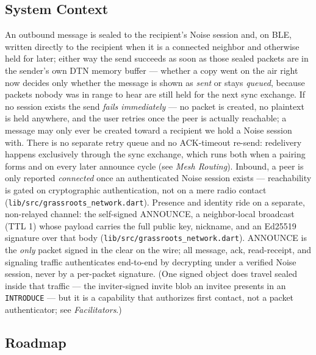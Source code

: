 \documentclass[11pt]{report}
\newcommand{\code}[1]{\texttt{\small #1}}
\begin{document}
\subsection{System Context}

An outbound message is sealed to the recipient's Noise session and, on BLE, written directly to the recipient when it is a connected neighbor and otherwise held for later; either way the send succeeds as soon as those sealed packets are in the sender's own DTN memory buffer — whether a copy went on the air right now decides only whether the message is shown as \emph{sent} or stays \emph{queued}, because packets nobody was in range to hear are still held for the next sync exchange. If no session exists the send \emph{fails immediately} --- no packet is created, no plaintext is held anywhere, and the user retries once the peer is actually reachable; a message may only ever be created toward a recipient we hold a Noise session with. There is no separate retry queue and no ACK-timeout re-send: redelivery happens exclusively through the sync exchange, which runs both when a pairing forms and on every later announce cycle (see \emph{Mesh Routing}). Inbound, a peer is only reported \emph{connected} once an authenticated Noise session exists — reachability is gated on cryptographic authentication, not on a mere radio contact (\code{lib/src/grassroots_network.dart}). Presence and identity ride on a separate, non-relayed channel: the self-signed ANNOUNCE, a neighbor-local broadcast (TTL 1) whose payload carries the full public key, nickname, and an Ed25519 signature over that body (\code{lib/src/grassroots_network.dart}). ANNOUNCE is the \emph{only} packet signed in the clear on the wire; all message, ack, read-receipt, and signaling traffic authenticates end-to-end by decrypting under a verified Noise session, never by a per-packet signature. (One signed object does travel sealed inside that traffic — the inviter-signed invite blob an invitee presents in an \code{INTRODUCE} — but it is a capability that authorizes first contact, not a packet authenticator; see \emph{Facilitators}.)

\subsection{Roadmap}
\end{document}
